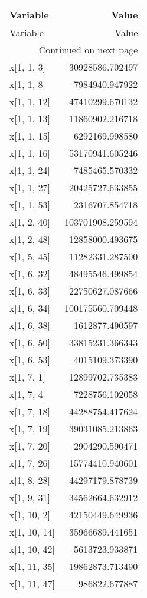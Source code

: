 \begin{longtable}{lr}
\toprule
Variable & Value \\
\midrule
\endfirsthead
\toprule
Variable & Value \\
\midrule
\endhead
\midrule
\multicolumn{2}{r}{Continued on next page} \\
\midrule
\endfoot
\bottomrule
\endlastfoot
x[1, 1, 3] & 30928586.702497 \\
x[1, 1, 8] & 7984940.947922 \\
x[1, 1, 12] & 47410299.670132 \\
x[1, 1, 13] & 11860902.216718 \\
x[1, 1, 15] & 6292169.998580 \\
x[1, 1, 16] & 53170941.605246 \\
x[1, 1, 24] & 7485465.570332 \\
x[1, 1, 27] & 20425727.633855 \\
x[1, 1, 53] & 2316707.854718 \\
x[1, 2, 40] & 103701908.259594 \\
x[1, 2, 48] & 12858000.493675 \\
x[1, 5, 45] & 11282331.287500 \\
x[1, 6, 32] & 48495546.499854 \\
x[1, 6, 33] & 22750627.087666 \\
x[1, 6, 34] & 100175560.709448 \\
x[1, 6, 38] & 1612877.490597 \\
x[1, 6, 50] & 33815231.366343 \\
x[1, 6, 53] & 4015109.373390 \\
x[1, 7, 1] & 12899702.735383 \\
x[1, 7, 4] & 7228756.102058 \\
x[1, 7, 18] & 44288754.417624 \\
x[1, 7, 19] & 39031085.213863 \\
x[1, 7, 20] & 2904290.590471 \\
x[1, 7, 26] & 15774410.940601 \\
x[1, 8, 28] & 44297179.878739 \\
x[1, 9, 31] & 34562664.632912 \\
x[1, 10, 2] & 42150449.649936 \\
x[1, 10, 14] & 35966689.441651 \\
x[1, 10, 42] & 5613723.933871 \\
x[1, 11, 35] & 19862873.713490 \\
x[1, 11, 47] & 986822.677887 \\

\end{longtable}
